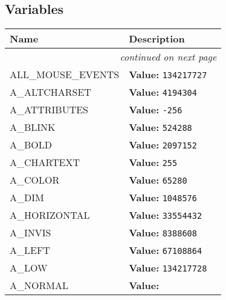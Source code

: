 
  \subsection{Variables}

\begin{longtable}{|p{}|p{}|l}
\cline{1-2}
\cline{1-2} \centering \textbf{Name} & \centering \textbf{Description}& \\
\cline{1-2}
\endhead\cline{1-2}\multicolumn{3}{r}{\small\textit{continued on next page}}\\\endfoot\cline{1-2}
\endlastfoot\raggedright A\-L\-L\-\_\-M\-O\-U\-S\-E\-\_\-E\-V\-E\-N\-T\-S\- & \raggedright \textbf{Value:} 
{\tt 134217727}&\\
\cline{1-2}
\raggedright A\-\_\-A\-L\-T\-C\-H\-A\-R\-S\-E\-T\- & \raggedright \textbf{Value:} 
{\tt 4194304}&\\
\cline{1-2}
\raggedright A\-\_\-A\-T\-T\-R\-I\-B\-U\-T\-E\-S\- & \raggedright \textbf{Value:} 
{\tt -256}&\\
\cline{1-2}
\raggedright A\-\_\-B\-L\-I\-N\-K\- & \raggedright \textbf{Value:} 
{\tt 524288}&\\
\cline{1-2}
\raggedright A\-\_\-B\-O\-L\-D\- & \raggedright \textbf{Value:} 
{\tt 2097152}&\\
\cline{1-2}
\raggedright A\-\_\-C\-H\-A\-R\-T\-E\-X\-T\- & \raggedright \textbf{Value:} 
{\tt 255}&\\
\cline{1-2}
\raggedright A\-\_\-C\-O\-L\-O\-R\- & \raggedright \textbf{Value:} 
{\tt 65280}&\\
\cline{1-2}
\raggedright A\-\_\-D\-I\-M\- & \raggedright \textbf{Value:} 
{\tt 1048576}&\\
\cline{1-2}
\raggedright A\-\_\-H\-O\-R\-I\-Z\-O\-N\-T\-A\-L\- & \raggedright \textbf{Value:} 
{\tt 33554432}&\\
\cline{1-2}
\raggedright A\-\_\-I\-N\-V\-I\-S\- & \raggedright \textbf{Value:} 
{\tt 8388608}&\\
\cline{1-2}
\raggedright A\-\_\-L\-E\-F\-T\- & \raggedright \textbf{Value:} 
{\tt 67108864}&\\
\cline{1-2}
\raggedright A\-\_\-L\-O\-W\- & \raggedright \textbf{Value:} 
{\tt 134217728}&\\
\cline{1-2}
\raggedright A\-\_\-N\-O\-R\-M\-A\-L\- & \raggedright \textbf{Value:} 

\end{longtable}
